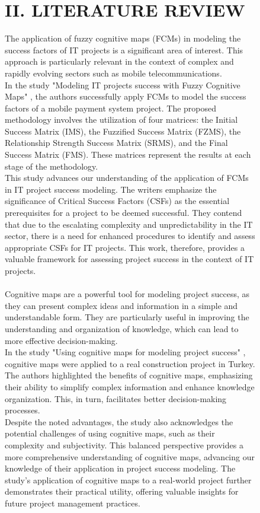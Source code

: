\documentclass{article}
\begin{document}
\begin{figure}[!t]
\begin{minipage}{0.49\textwidth}
\begin{center}
                \chapter{II. LITERATURE REVIEW}
            \end{center}
            The application of fuzzy cognitive maps (FCMs) in modeling the success factors of IT projects is a significant area of interest. This approach is particularly relevant in the context of complex and rapidly evolving sectors such as mobile telecommunications.\\
            In the study "{}Modeling IT projects success with Fuzzy Cognitive Maps"{} \cite{litlink18}, the authors successfully apply FCMs to model the success factors of a mobile payment system project. The proposed methodology involves the utilization of four matrices: the Initial Success Matrix (IMS), the Fuzzified Success Matrix (FZMS), the Relationship Strength Success Matrix (SRMS), and the Final Success Matrix (FMS). These matrices represent the results at each stage of the methodology.\\
            This study advances our understanding of the application of FCMs in IT project success modeling. The writers emphasize the significance of Critical Success Factors (CSFs) as the essential prerequisites for a project to be deemed successful. They contend that due to the escalating complexity and unpredictability in the IT sector, there is a need for enhanced procedures to identify and assess appropriate CSFs for IT projects. This work, therefore, provides a valuable framework for assessing project success in the context of IT projects.\\
            ~\\
            Cognitive maps are a powerful tool for modeling project success, as they can present complex ideas and information in a simple and understandable form. They are particularly useful in improving the understanding and organization of knowledge, which can lead to more effective decision-making.\\
            In the study "{}Using cognitive maps for modeling project success"{} \cite{litlink19}, cognitive maps were applied to a real construction project in Turkey. The authors highlighted the benefits of cognitive maps, emphasizing their ability to simplify complex information and enhance knowledge organization. This, in turn, facilitates better decision-making processes.\\
            Despite the noted advantages, the study also acknowledges the potential challenges of using cognitive maps, such as their complexity and subjectivity. This balanced perspective provides a more comprehensive understanding of cognitive maps, advancing our knowledge of their application in project success modeling. The study's application of cognitive maps to a real-world project further demonstrates their practical utility, offering valuable insights for future project management practices.\\

\end{minipage}
\end{figure}
\end{document}
